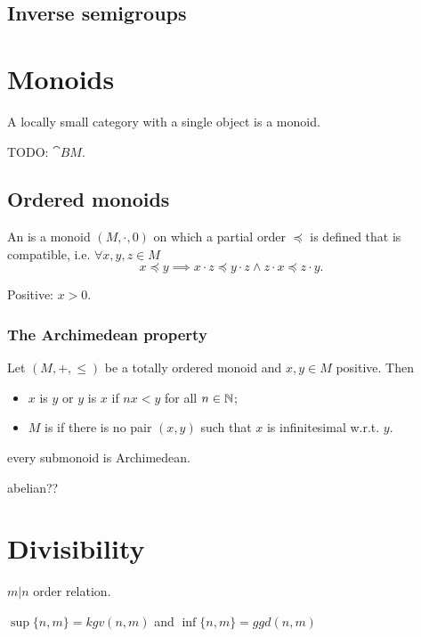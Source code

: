 \subsection{Inverse semigroups}

\section{Monoids}


\begin{lemma}
A locally small category with a single object is a monoid.
\end{lemma}
TODO:  $\cat{B}M$.


\subsection{Ordered monoids}
\begin{definition}
An  is a monoid $(M, \cdot, 0)$ on which a partial order $\preceq$ is defined that is compatible, i.e. $\forall x,y,z\in M$
\[ x\preceq y \implies x\cdot z \preceq y \cdot z \land z\cdot x \preceq z \cdot y. \]

Positive: $x > 0$.
\end{definition}

\subsubsection{The Archimedean property}
\begin{definition}
Let $(M,+,\leq)$ be a totally ordered monoid and $x,y\in M$ positive. Then
\begin{itemize}
\item $x$ is  $y$ or $y$ is  $x$ if $nx<y$ for all $n\in\mathbb{N}$;
\item $M$ is  if there is no pair $(x,y)$ such that $x$ is infinitesimal w.r.t. $y$.
\end{itemize}
\end{definition}
every submonoid is Archimedean.

abelian??

\section{Divisibility}
$m|n$ order relation.

$\sup\{n,m\} = kgv(n,m)$ and $\inf\{n,m\} = ggd(n,m)$



